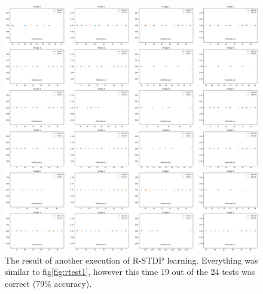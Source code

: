 \documentclass{article}
\begin{document}
	\begin{figure}[h]
		\includegraphics[width=\textwidth]{rstdp_test2.png}
		\caption{The result of another execution of R-STDP learning. Everything was similar to fig\ref{fig:rtest1}, however this time 19 out of the 24 tests was correct (79\% accuracy).}
		\label{fig:rtest2}
	\end{figure}	
	
\end{document}

